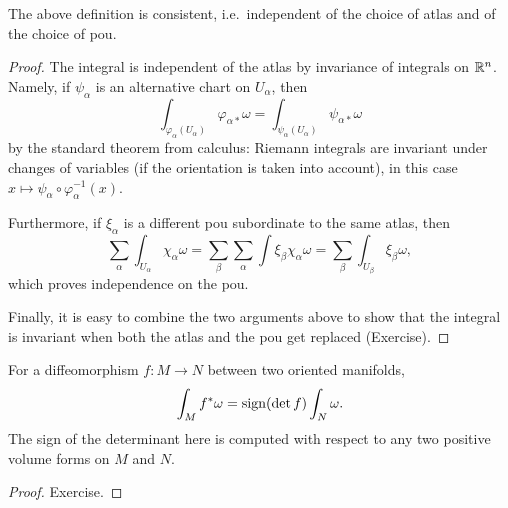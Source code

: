 \begin{prop}
    The above definition is consistent, i.e.\ independent of the choice of atlas and of the choice of \gls{pou}.
\end{prop}
\begin{proof}
    The integral is independent of the atlas by invariance of integrals on $\mathbb{R}^n$. Namely, if $\psi_\alpha$ is an alternative chart on $U_\alpha$, then
    \[\int_{\varphi_\alpha(U_\alpha)}\varphi_{\alpha\ast}\omega=\int_{\psi_\alpha(U_\alpha)}\psi_{\alpha\ast}\omega\]
    by the standard theorem from calculus: Riemann integrals are invariant under changes of variables (if the orientation is taken into account), in this case $x\mapsto \psi_\alpha\circ\varphi_\alpha^{-1}(x)$.

    Furthermore, if $\xi_\alpha$ is a different \gls{pou} subordinate to the same atlas, then
    \[\sum_\alpha\int_{U_\alpha}\chi_\alpha\omega=\sum_\beta\sum_\alpha\int \xi_\beta\chi_\alpha\omega=\sum_\beta\int_{U_\beta}\xi_\beta\omega,\]
    which proves independence on the \gls{pou}.

    Finally, it is easy to combine the two arguments above to show that the integral is invariant when both the atlas and the \gls{pou} get replaced (Exercise).
\end{proof}


\begin{prop}
    For a diffeomorphism $f:M\to N$ between two oriented manifolds,
    \[\int_M f^\ast \omega=\operatorname{sign}(\det f) \int_N \omega.\]
    The sign of the determinant here is computed with respect to any two positive volume forms on $M$ and $N$.
\end{prop}
\begin{proof}
Exercise.
\end{proof}



